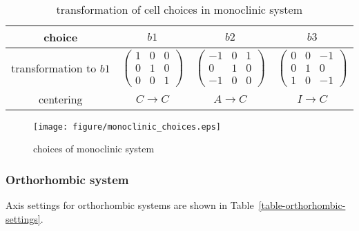 \begin{table}[htb]
  \centering
  \caption{transformation of cell choices in monoclinic system}
  \label{table-monoclinic-cellchoice}
  \begin{tabular}{c|ccc}
    \hline\hline
    choice                 & $b1$                                                & $b2$                                                  & $b3$                                                  \\
    \hline
    transformation to $b1$ & $\begin{pmatrix} 1&0&0\\0&1&0\\0&0&1 \end{pmatrix}$ & $\begin{pmatrix} -1&0&1\\0&1&0\\-1&0&0 \end{pmatrix}$ & $\begin{pmatrix} 0&0&-1\\0&1&0\\1&0&-1 \end{pmatrix}$ \\
    \hline
    centering              & $C \to C$                                           & $A \to C$                                             & $I \to C$                                             \\
    \hline\hline
  \end{tabular}
\end{table}

\begin{figure}[htb]
  \centering
  \texttt{[image: figure/monoclinic\_choices.eps]}
  \caption{choices of monoclinic system}
  \label{fig:monoclinic-choices}
\end{figure}

\subsubsection{Orthorhombic system}

Axis settings for orthorhombic systems are shown in Table~\ref{table-orthorhombic-settings}.

